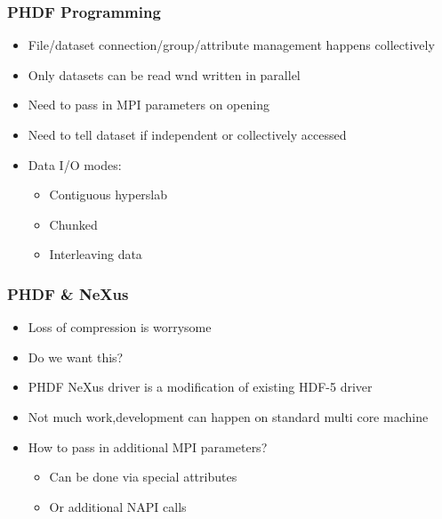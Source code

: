 \documentclass{beamer}
\begin{document}
\begin{frame}
\frametitle{PHDF Programming}
\begin{itemize}
\item File/dataset connection/group/attribute management happens collectively
\item Only datasets can be read wnd written in parallel
\item Need to pass in MPI parameters on opening
\item Need to tell dataset if independent or collectively accessed
\item Data I/O modes:
\begin{itemize}
\item Contiguous hyperslab
\item Chunked
\item Interleaving data
\end{itemize}
\end{itemize}
\end{frame}

\begin{frame}
\frametitle{PHDF \& NeXus}
\begin{itemize}
\item Loss of compression is worrysome
\item Do we want this?
\item PHDF NeXus driver is a modification of existing HDF-5 driver
\item Not much work,development can happen on standard multi core machine
\item How to pass in additional MPI parameters?
\begin{itemize}
\item Can be done via special attributes
\item Or additional NAPI calls
\end{itemize}
\end{itemize}
\end{frame}
\end{document}
